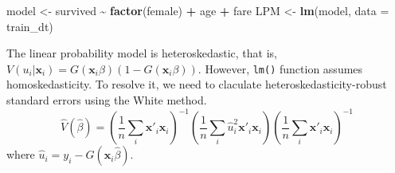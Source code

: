 \documentclass[
  12pt,
]{article}
\newenvironment{Shaded}{\begin{snugshade}}{\end{snugshade}}
\newcommand{\DataTypeTok}[1]{\textcolor[rgb]{0.13,0.29,0.53}{#1}}
\newcommand{\KeywordTok}[1]{\textcolor[rgb]{0.13,0.29,0.53}{\textbf{#1}}}
\newcommand{\NormalTok}[1]{#1}
\newcommand{\OperatorTok}[1]{\textcolor[rgb]{0.81,0.36,0.00}{\textbf{#1}}}
\newcommand{\StringTok}[1]{\textcolor[rgb]{0.31,0.60,0.02}{#1}}
\begin{document}
\begin{Shaded}
\begin{Highlighting}[]
\NormalTok{model \textless{}{-}}\StringTok{ }\NormalTok{survived }\OperatorTok{\textasciitilde{}}\StringTok{ }\KeywordTok{factor}\NormalTok{(female) }\OperatorTok{+}\StringTok{ }\NormalTok{age }\OperatorTok{+}\StringTok{ }\NormalTok{fare}
\NormalTok{LPM \textless{}{-}}\StringTok{ }\KeywordTok{lm}\NormalTok{(model, }\DataTypeTok{data =}\NormalTok{ train\_dt)}
\end{Highlighting}
\end{Shaded}

The linear probability model is heteroskedastic,
that is, \(V(u_i | \mathbf{x}_i) = G(\mathbf{x}_i \beta)(1 - G(\mathbf{x}_i \beta))\).
However, \texttt{lm()} function assumes homoskedasticity.
To resolve it, we need to claculate heteroskedasticity-robust standard errors using the White method.
\begin{equation*}
  \hat{V}(\hat{\beta}) =
  \left( \frac{1}{n} \sum_i \mathbf{x}'_i \mathbf{x}_i  \right)^{-1}
  \left( \frac{1}{n} \sum_i \hat{u}_i^2 \mathbf{x}'_i \mathbf{x}_i \right)
  \left( \frac{1}{n} \sum_i \mathbf{x}'_i \mathbf{x}_i \right)^{-1}
\end{equation*}
where \(\hat{u}_i = y_i - G(\mathbf{x}_i \hat{\beta})\).
\end{document}
